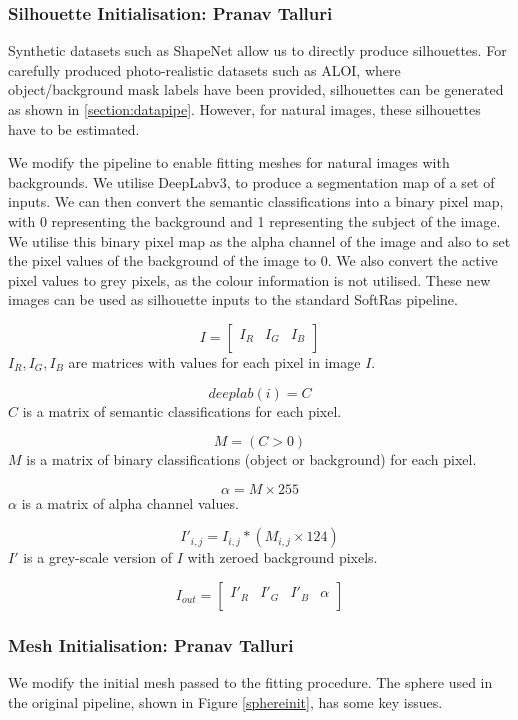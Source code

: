 \documentclass{article}
\begin{document}
\subsubsection{Silhouette Initialisation: Pranav Talluri}
\label{section:silimp}

Synthetic datasets such as ShapeNet allow us to directly produce silhouettes. For carefully produced photo-realistic datasets such as ALOI, where object/background mask labels have been provided, silhouettes can be generated as shown in \ref{section:datapipe}. However, for natural images, these silhouettes have to be estimated.

We modify the pipeline to enable fitting meshes for natural images with backgrounds. We utilise DeepLabv3, to produce a segmentation map of a set of inputs. We can then convert the semantic classifications into a binary pixel map, with 0 representing the background and 1 representing the subject of the image. We utilise this binary pixel map as the alpha channel of the image and also to set the pixel values of the background of the image to 0. We also convert the active pixel values to grey pixels, as the colour information is not utilised. These new images can be used as silhouette inputs to the standard SoftRas pipeline.

\[
  I = 
  \begin{bmatrix}
    I_R & I_G & I_B\\
  \end{bmatrix}
\] $I_R, I_G, I_B$ are matrices with values for each pixel in image $I$.

\[deeplab(i) = C\] $C$ is a matrix of semantic classifications for each pixel.

\[M = (C > 0)\] $M$ is a matrix of binary classifications (object or background) for each pixel.

\[\alpha = M \times 255\] $\alpha$ is a matrix of alpha channel values.

\[I'_{i,j} = I_{i,j} * (M_{i,j} \times 124)\] $I'$ is a grey-scale version of $I$ with zeroed background pixels.

\[
  I_{out} =  
  \begin{bmatrix}
    I'_R & I'_G & I'_B & \alpha\\
  \end{bmatrix}
\]

\subsubsection{Mesh Initialisation: Pranav Talluri}
\label{section:meshimp}
We modify the initial mesh passed to the fitting procedure. The sphere used in the original pipeline, shown in Figure \ref{sphereinit}, has some key issues.
\end{document}
